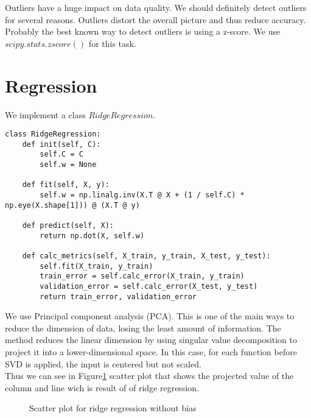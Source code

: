 \documentclass[a4paper, twoside, english]{article}
\begin{document}
Outliers have a huge impact on data quality. We should definitely detect outliers for several reasons. Outliers distort the overall picture and thus reduce accuracy. Probably the best known way to detect outliers is using a z-score. We use $scipy.stats.zscore()$ for this task.\\


\section{Regression}
We implement a class $RidgeRegression$.
\begin{lstlisting}[language=iPython]
class RidgeRegression:
	def init(self, C):
		self.C = C
		self.w = None
	
	def fit(self, X, y):
		self.w = np.linalg.inv(X.T @ X + (1 / self.C) * np.eye(X.shape[1])) @ (X.T @ y)
	
	def predict(self, X):
		return np.dot(X, self.w)
	
	def calc_metrics(self, X_train, y_train, X_test, y_test):
		self.fit(X_train, y_train)
		train_error = self.calc_error(X_train, y_train)
		validation_error = self.calc_error(X_test, y_test)
		return train_error, validation_error
\end{lstlisting}
We use Principal component analysis (PCA). This is one of the main ways to reduce the dimension of data, losing the least amount of information. The method reduces the linear dimension by using singular value decomposition to project it into a lower-dimensional space. In this case, for each function before SVD is applied, the input is centered but not scaled.\\
Thus we can see in Figure\ref{fig:scatter} scatter plot that shows the projected value of the column and line wich is result of of ridge regression.\\
 \begin{figure}[h!]
 \centerline
{
	\qquad
	\qquad
}
\caption[scatter]{Scatter plot for ridge regression without bias}
\label{fig:scatter}
\end{figure}
\end{document}
